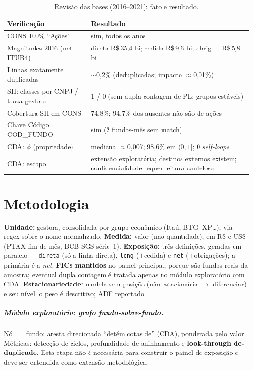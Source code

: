 \documentclass[12pt,a4paper]{report}
\begin{document}
\begin{table}[H]\centering
\caption{Revisão das bases (2016--2021): fato e resultado.}
\label{tab:qual}
\small
\begin{tabular}{ll}
\toprule
\textbf{Verificação} & \textbf{Resultado} \\
\midrule
CONS 100\% ``Ações''                 & sim, todos os anos \\
Magnitudes 2016 (net ITUB4)          & direta R\$\,35,4 bi; cedida R\$\,9,6 bi; obrig.\ $-$R\$\,5,8 bi \\
Linhas exatamente duplicadas         & $\sim$0,2\% (deduplicadas; impacto $\approx$0,01\%) \\
SH: classes por CNPJ / troca gestora & 1 / 0 (sem dupla contagem de PL; grupos estáveis) \\
Cobertura SH em CONS                 & 74,8\%; 94,7\% dos ausentes não são de ações \\
Chave Código $=$ COD\_FUNDO          & sim (2 fundos-mês sem match) \\
CDA: $\phi$ (propriedade)            & mediana $\approx$0,007; 98,6\% em $(0,1]$; 0 \emph{self-loops} \\
CDA: escopo                          & extensão exploratória; destinos externos existem; confidencialidade requer leitura cautelosa \\
\bottomrule
\end{tabular}
\end{table}

\chapter{Metodologia}\label{cap:metodo}
\textbf{Unidade:} gestora, consolidada por grupo econômico (Itaú, BTG, XP\ldots), via regex sobre o nome
normalizado. \textbf{Medida:} valor (não quantidade), em R\$ e US\$ (PTAX fim de mês, BCB SGS série~1).
\textbf{Exposição:} três definições, geradas em paralelo --- \texttt{direta} (só a linha direta),
\texttt{long} ($+$cedida) e \texttt{net} ($+$obrigações); a primária é a \emph{net}. \textbf{FICs mantidos}
no painel principal, porque são fundos reais da amostra; eventual dupla contagem é tratada apenas no módulo
exploratório com CDA. \textbf{Estacionariedade:} modela-se a posição (não-estacionária $\to$
diferenciar) e seu nível; o peso é descritivo; ADF reportado.

\paragraph{Módulo exploratório: grafo fundo-sobre-fundo.} Nó $=$ fundo; aresta direcionada ``detém cotas de''
(CDA), ponderada pelo valor. Métricas: detecção de ciclos, profundidade de aninhamento e
\textbf{look-through de-duplicado}. Esta etapa não é necessária para construir o painel de exposição e deve
ser entendida como extensão metodológica.
\end{document}
